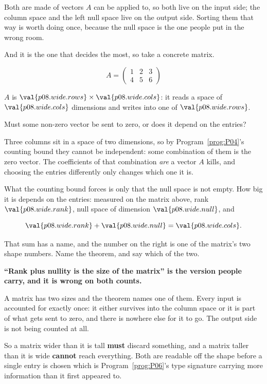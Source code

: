 \begin{fr}
Both are made of vectors $A$ can be applied to, so both live on the input side;
the column space and the left null space live on the output side. Sorting them
that way is worth doing once, because the null space is the one people put in
the wrong room.

And it is the one that decides the most, so take a concrete matrix.

\[ A = \begin{pmatrix} 1 & 2 & 3 \\ 4 & 5 & 6 \end{pmatrix} \]

$A$ is $\val{p08.wide.rows} \times \val{p08.wide.cols}$: it reads a space of
$\val{p08.wide.cols}$ dimensions and writes into one of
$\val{p08.wide.rows}$.

Must some non-zero vector be sent to zero, or does it depend on the entries?
\dotline
\nextframe
\end{fr}

\begin{fr}
Three columns sit in a space of two dimensions, so by
Program~\ref{prog:P04}'s counting bound they cannot be independent: some
combination of them is the zero vector. The coefficients of that combination
\emph{are} a vector $A$ kills, and choosing the entries differently only
changes which one it is.

What the counting bound forces is only that the null space is not empty. How
big it is depends on the entries: measured on the matrix above, rank
$\val{p08.wide.rank}$, null space of dimension $\val{p08.wide.null}$, and

\[ \val{p08.wide.rank} + \val{p08.wide.null} = \val{p08.wide.cols}. \]

That sum has a name, and the number on the right is one of the matrix's two
shape numbers. Name the theorem, and say which of the two.
\dotline
\nextframe
\end{fr}

\begin{fr}
\begin{trapbox}
\textbf{\enquote{Rank plus nullity is the size of the matrix} is the version
people carry, and it is wrong on both counts.}

A matrix has two sizes and the theorem names one of them. Every input is
accounted for exactly once: it either survives into the column space or it is
part of what gets sent to zero, and there is nowhere else for it to go. The
output side is not being counted at all.

So a matrix wider than it is tall \textbf{must} discard something, and a matrix
taller than it is wide \textbf{cannot} reach everything. Both are readable off
the shape before a single entry is chosen \dash{} which is
Program~\ref{prog:P06}'s type signature carrying more information than it first
appeared to.
\end{trapbox}
\end{fr}

